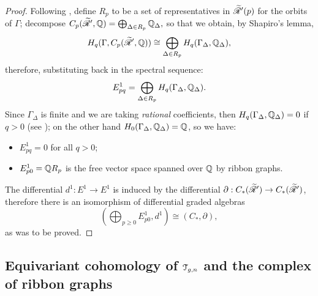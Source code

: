 \begin{proof}
  Following \cite[p.\ 173]{brown}, define $R_p$ to be a set of
  representatives in $\mathscr{\widetilde R}_{}'(p)$ for the orbits of $\Gamma$; decompose
  \begin{math}
    C_p(\mathscr{\widetilde R}_{}', \mathbb{Q}) = \bigoplus_{\Delta \in R_p} \mathbb{Q}_\Delta,
  \end{math}
  so that we obtain, by Shapiro's lemma,
  \begin{equation*}
    H_q(\Gamma, C_p(\mathscr{\widetilde R}_{}', \mathbb{Q})) \cong \bigoplus_{\Delta \in R_p} H_q(\Gamma_\Delta, \mathbb{Q}_\Delta),
  \end{equation*}
  therefore, substituting back in the spectral sequence:
  \begin{equation*}
    E^1_{pq} = \bigoplus_{\Delta \in R_p} H_q(\Gamma_\Delta, \mathbb{Q}_\Delta).
  \end{equation*}
  Since $\Gamma_\Delta$ is finite and we are taking \emph{rational}
  coefficients, then $H_q(\Gamma_\Delta, \mathbb{Q}_\Delta) = 0$ if $q>0$ (see
  \cite[III.10.2]{brown}); on the other hand $H_0(\Gamma_\Delta, \mathbb{Q}_\Delta) = \mathbb{Q}$, so
  we have:
  \begin{itemize}
  \item $E^1_{pq} = 0$ for all $q>0$;
  \item $E^1_{p0} = \mathbb{Q} R_p$ is the free vector space spanned over $\mathbb{Q}$ by
    ribbon graphs.
  \end{itemize}

  The differential $d^1: E^1 \to E^1$ is induced by the differential $\partial:
  C_*(\mathscr{\widetilde R}_{}') \to C_*(\mathscr{\widetilde R}_{}')$, therefore there is an isomorphism of
  differential graded algebras
  \begin{equation}
    \label{eq:4}
    (\bigoplus_{p\geq0} E^1_{p0}, d^1) \cong (C_*, \partial),
  \end{equation}
  as was to be proved.
\end{proof}


\subsection{Equivariant cohomology of $\mathcal{T}_{g,n}$ and the complex of ribbon graphs}
\label{sec:rg-complex}



